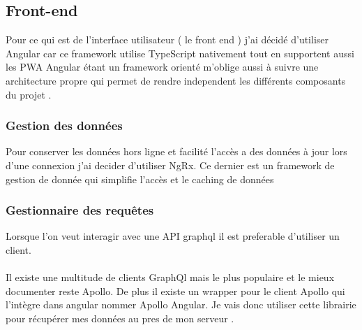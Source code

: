 \subsection{Front-end}\label{subsec:front-end}
Pour ce qui est de l'interface utilisateur ( le front end ) j'ai décidé d'utiliser Angular car ce framework utilise TypeScript nativement tout en supportent aussi les PWA
Angular étant un framework orienté m'oblige aussi à suivre une architecture propre qui permet de rendre independent les différents composants du projet .

\subsubsection{Gestion des données}
Pour conserver les données hors ligne et facilité l'accès a des données à jour lors d'une connexion j'ai decider d'utiliser NgRx.
Ce dernier est un framework de gestion de donnée qui simplifie l'accès et le caching de données
\subsubsection{Gestionnaire des requêtes}
Lorsque l'on veut interagir avec une API graphql il est preferable d'utiliser un client.\\\\
Il existe une multitude de clients GraphQl mais le plus populaire et le mieux documenter reste Apollo.
De plus il existe un wrapper pour le client Apollo qui l'intègre dans angular nommer Apollo Angular.
Je vais donc utiliser cette librairie pour récupérer mes données au pres de mon serveur .
